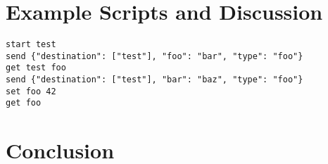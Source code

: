 \documentclass[11pt]{article}
\begin{document}
\section{Example Scripts and Discussion}\label{sec:Ex}

\begin{lstlisting}[language={}, caption={Example Script 1}, basicstyle=\ttfamily]
start test
send {"destination": ["test"], "foo": "bar", "type": "foo"}
get test foo
send {"destination": ["test"], "bar": "baz", "type": "foo"}
set foo 42
get foo
\end{lstlisting}

\section{Conclusion}\label{sec:Conc}

\clearpage

\printbibliography
\end{document}
